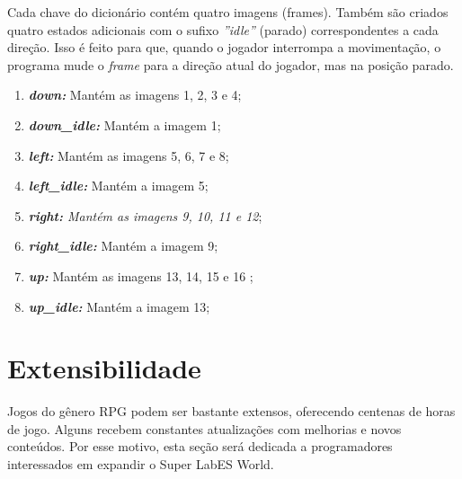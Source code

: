Cada chave do dicionário contém quatro imagens (frames). Também são criados quatro estados adicionais com o sufixo \textit{''idle''} (parado) correspondentes a cada direção. Isso é feito para que, quando o jogador interrompa a movimentação, o programa mude o \textit{frame} para a direção atual do jogador, mas na posição parado. 
\begin{enumerate}
    \item \textit{\textbf{down:}} Mantém as imagens 1, 2, 3 e 4;
    \item \textit{\textbf{down\_idle:}} Mantém a imagem 1;
    \item \textit{\textbf{left:}} Mantém as imagens 5, 6, 7 e 8;
    \item \textit{\textbf{left\_idle:}} Mantém a imagem 5;
    \item \textit{\textbf{right:} Mantém as imagens 9, 10, 11 e 12};
    \item \textit{\textbf{right\_idle:}} Mantém a imagem 9;
    \item \textit{\textbf{up:}} Mantém as imagens 13, 14, 15 e 16 ;
    \item \textit{\textbf{up\_idle:}} Mantém a imagem 13;
\end{enumerate}

% 


\clearpage

\section{Extensibilidade}
Jogos do gênero RPG podem ser bastante extensos, oferecendo centenas de horas de jogo. Alguns recebem constantes atualizações com melhorias e novos conteúdos. Por esse motivo, esta seção será dedicada a programadores interessados em expandir o Super LabES World.

